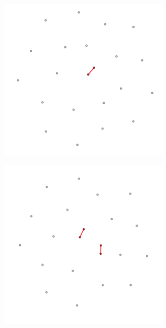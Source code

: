 \begin{figure}
    \centering
    \begin{subfigure}{0.3\textwidth}
        \centering
        \includegraphics[width=0.92\textwidth]{figures/temporal/0.png}
        \caption{}
        \label{fig:temporal net A}
    \end{subfigure}
    \hfill
    \begin{subfigure}{0.3\textwidth}
        \centering
        \includegraphics[width=0.92\textwidth]{figures/temporal/1.png}

\end{subfigure}
\end{figure}
